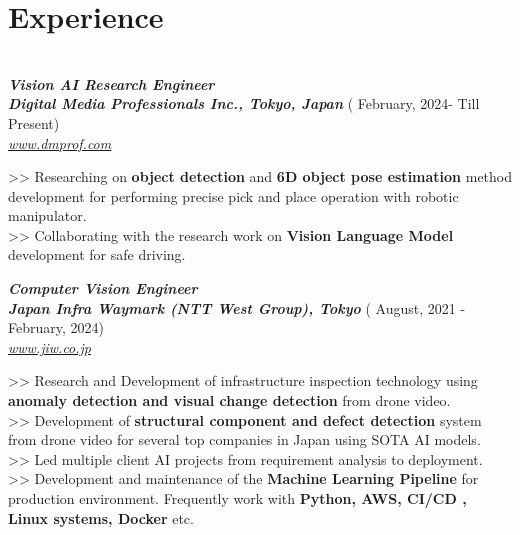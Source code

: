 \documentclass[letterpaper]{twentysecondcv} %
\begin{document}
\makeprofile %

\section{Experience}\\


{\bfseries \itshape \color{gray} Vision AI Research Engineer} \\
\textbf{\itshape \color{mainblue} Digital Media Professionals Inc., Tokyo, Japan }{\color{golden}  ( February, 2024- Till Present) }\\
{ \href {https://www.dmprof.com}{\itshape \color{blue} www.dmprof.com}}

\begin{multiline}
>> Researching on \textbf{object detection} and \textbf{6D object pose estimation} method development for performing precise pick and place operation with robotic manipulator.\\
>> Collaborating with the research work on \textbf{Vision Language Model} development for safe driving.
\end{multiline}

{\bfseries \itshape \color{gray} Computer Vision Engineer} \\
\textbf{\itshape \color{mainblue} Japan Infra Waymark (NTT West Group), Tokyo }{\color{golden}  ( August, 2021 - February, 2024) }\\
{ \href {https://www.jiw.co.jp}{\itshape \color{blue} www.jiw.co.jp}}

\begin{multiline}
>> Research and Development of infrastructure inspection technology using \textbf{anomaly detection and visual change detection} from drone video.\\
>> Development of \textbf{structural component and defect detection} system from drone video for several top companies in Japan using SOTA AI models. \\
>> Led multiple client AI  projects from requirement analysis to deployment. \\
>> Development and maintenance of the \textbf{Machine Learning Pipeline} for production environment. Frequently work with \textbf{Python, AWS, CI/CD , Linux systems, Docker} etc.
\end{multiline}
\end{document}
